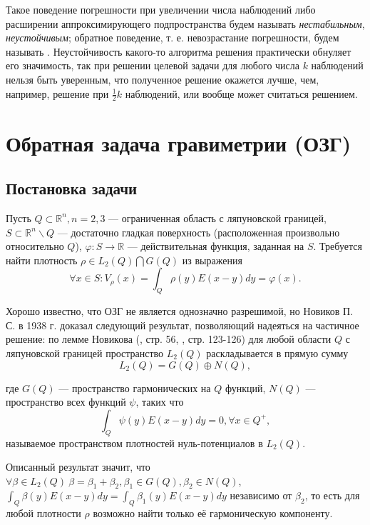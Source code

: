 \documentclass[a4paper]{article}
\newcommand{\V}[1]{\int_Q #1(y) E(x-y) dy}
\newcommand{\R}[1]{\mathbb{R}^#1}
\begin{document}
Такое поведение погрешности при увеличении числа наблюдений либо расширении аппроксимирующего подпространства будем называть {\it нестабильным}, {\it неустойчивым}; обратное поведение, т. е. невозрастание погрешности, будем называть {}.
Неустойчивость какого-то алгоритма решения практически обнуляет его значимость,
так при решении целевой задачи для любого числа $k$ наблюдений нельзя быть уверенным,
что полученное решение окажется лучше, чем, например, решение при $\frac{1}{2}k$ наблюдений, или вообще может считаться решением.

\newpage
\section{ Обратная задача гравиметрии (ОЗГ)}
\subsection{Постановка задачи}
Пусть $Q\subset \R{n}, n=2,3$ --- ограниченная область с ляпуновской границей,
$S \subset \R{n}\backslash Q$ --- достаточно гладкая поверхность (расположенная произвольно относительно $Q$), $\varphi: S \rightarrow \mathbb{R}$ --- действительная функция, заданная на $S$.
Требуется найти плотность $\rho \in L_2(Q) \bigcap G(Q)$ из выражения
\begin{equation}
  \forall x \in S: V_\rho(x)= \V{\rho}= \varphi(x).
\end{equation}

Хорошо известно, что ОЗГ не является однозначно разрешимой, но Новиков П. С. в 1938 г. доказал следующий результат, позволяющий надеяться на частичное решение:
по лемме Новикова (\cite{lezh}, стр. 56, \cite{nov}, стр. 123-126) для любой области $Q$ с ляпуновской границей пространство $L_2(Q)$ раскладывается в прямую сумму
\begin{equation}
  L_2(Q)= G(Q) \oplus N(Q),
\end{equation}

где $G(Q)$ --- пространство гармонических на $Q$ функций, $N(Q)$ --- пространство всех функций $\psi$, таких что
\begin{equation}
  \V{\psi}=0, \forall x\in Q^+,
\end{equation}
называемое пространством плотностей нуль-потенциалов в $L_2(Q)$.

Описанный результат значит, что $\forall \beta \in L_2(Q) \ \beta = \beta_1 + \beta_2, \beta_1 \in G(Q), \beta_2 \in N(Q)$, $\V{\beta}=\V{\beta_1}$ независимо от $\beta_2$, то есть для любой плотности $\rho$ возможно найти только её гармоническую компоненту.
\end{document}
